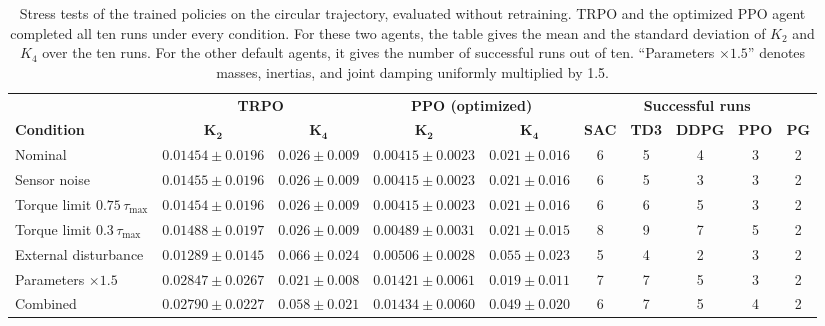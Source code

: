 \documentclass{ieeeaccess}
\begin{document}
\begin{table}[t]
    \centering
    \caption{Stress tests of the trained policies on the circular trajectory, evaluated without retraining.
    TRPO and the optimized PPO agent completed all ten runs under every condition. For these two agents, the
    table gives the mean and the standard deviation of $K_2$ and $K_4$ over the ten runs. For the other
    default agents, it gives the number of successful runs out of ten. ``Parameters $\times 1.5$'' denotes
    masses, inertias, and joint damping uniformly multiplied by 1.5.}
    \label{tab:robustness_eval}
    \renewcommand{\arraystretch}{1.2}
    \setlength{\tabcolsep}{4pt}
    \small
    \begin{tabular}{lccccccccc}
        \toprule
        & \multicolumn{2}{c}{\textbf{TRPO}} & \multicolumn{2}{c}{\textbf{PPO (optimized)}} &
          \multicolumn{5}{c}{\textbf{Successful runs}} \\
        \cmidrule(lr){2-3} \cmidrule(lr){4-5} \cmidrule(lr){6-10}
        \textbf{Condition} & $\boldsymbol{K_2}$ & $\boldsymbol{K_4}$ & $\boldsymbol{K_2}$ & $\boldsymbol{K_4}$ &
          \textbf{SAC} & \textbf{TD3} & \textbf{DDPG} & \textbf{PPO} & \textbf{PG} \\
        \midrule
        Nominal & $0.01454 \pm 0.0196$ & $0.026 \pm 0.009$ & $0.00415 \pm 0.0023$ & $0.021 \pm 0.016$ &
          6 & 5 & 4 & 3 & 2 \\
        Sensor noise & $0.01455 \pm 0.0196$ & $0.026 \pm 0.009$ & $0.00415 \pm 0.0023$ & $0.021 \pm 0.016$ &
          6 & 5 & 3 & 3 & 2 \\
        Torque limit $0.75\,\tau_{\max}$ & $0.01454 \pm 0.0196$ & $0.026 \pm 0.009$ & $0.00415 \pm 0.0023$ &
          $0.021 \pm 0.016$ & 6 & 6 & 5 & 3 & 2 \\
        Torque limit $0.3\,\tau_{\max}$ & $0.01488 \pm 0.0197$ & $0.026 \pm 0.009$ & $0.00489 \pm 0.0031$ &
          $0.021 \pm 0.015$ & 8 & 9 & 7 & 5 & 2 \\
        External disturbance & $0.01289 \pm 0.0145$ & $0.066 \pm 0.024$ & $0.00506 \pm 0.0028$ &
          $0.055 \pm 0.023$ & 5 & 4 & 2 & 3 & 2 \\
        Parameters $\times 1.5$ & $0.02847 \pm 0.0267$ & $0.021 \pm 0.008$ & $0.01421 \pm 0.0061$ &
          $0.019 \pm 0.011$ & 7 & 7 & 5 & 3 & 2 \\
        Combined & $0.02790 \pm 0.0227$ & $0.058 \pm 0.021$ & $0.01434 \pm 0.0060$ & $0.049 \pm 0.020$ &
          6 & 7 & 5 & 4 & 2 \\
        \bottomrule
    \end{tabular}
\end{table}
\end{document}
